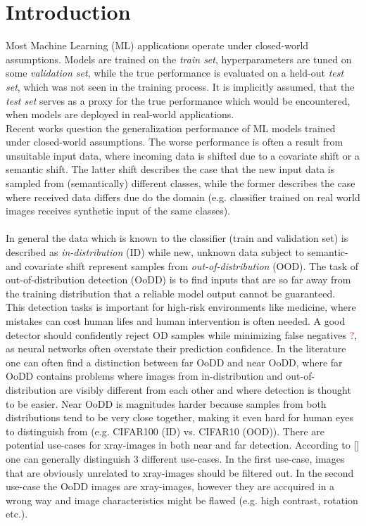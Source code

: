\section{Introduction}
\raggedbottom

Most Machine Learning (ML) applications operate under closed-world assumptions.
Models are trained on the \textit{train set}, hyperparameters are tuned on some \textit{validation set}, while the true performance is evaluated on a held-out \textit{test set}, which was not seen in the training process.
It is implicitly assumed, that the \textit{test set} serves as a proxy for the true performance which would be encountered, when models are deployed in real-world applications.
\\
Recent works question the generalization performance of ML models trained under closed-world assumptions.
The worse performance is often a result from unsuitable input data, where incoming data is shifted due to a covariate shift or a semantic shift.
The latter shift describes the case that the new input data is sampled from (semantically) different classes, while the former describes the case where received data differs due do the domain (e.g. classifier trained on real world images receives synthetic input of the same classes).
\\
\\
In general the data which is known to the classifier (train and validation set) is described as \textit{in-distribution} (ID) while new, unknown data subject to semantic- and covariate shift represent samples from \textit{out-of-distribution} (OOD).
The task of out-of-distribution detection (OoDD) is to find inputs that are so far away from the training distribution that a reliable model output cannot be guaranteed.
\\
This detection tasks is important for high-risk environments like medicine, where mistakes can cost human lifes and human intervention is often needed.
A good detector should confidently reject OD samples while minimizing false negatives \textcolor{red}{?}, as neural networks often overstate their prediction confidence.
In the literature one can often find a distinction between far OoDD and near OoDD, where far OoDD contains problems where images from in-distribution and out-of-distribution are visibly different from each other and where detection is thought to be easier.
Near OoDD is magnitudes harder because samples from both distributions tend to be very close together, making it even hard for human eyes to distinguish from (e.g. CIFAR100 (ID) vs. CIFAR10 (OOD)).
There are potential use-cases for xray-images in both near and far detection.
According to [] one can generally distinguish 3 different use-cases.
In the first use-case, images that are obviously unrelated to xray-images should be filtered out.
In the second use-case the OoDD images are xray-images, however they are accquired in a wrong way and image characteristics might be flawed (e.g. high contrast, rotation etc.).

